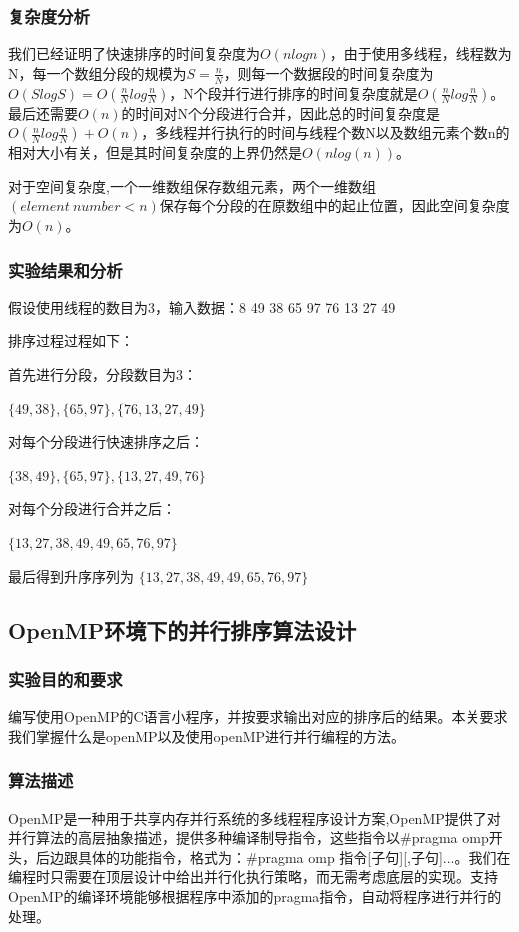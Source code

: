 \documentclass[supercite]{Experimental_Report}
\theoremstyle{definition}
\begin{document}
\subsubsection{复杂度分析}
我们已经证明了快速排序的时间复杂度为$O(nlogn)$，由于使用多线程，线程数为N，每一个数组分段的规模为$S=\frac{n}{N}$，则每一个数据段的时间复杂度为$O(SlogS)=O(\frac{n}{N}log\frac{n}{N})$，N个段并行进行排序的时间复杂度就是$O(\frac{n}{N}log\frac{n}{N})$。最后还需要$O(n)$的时间对N个分段进行合并，因此总的时间复杂度是$O(\frac{n}{N}log\frac{n}{N}) + O(n)$，多线程并行执行的时间与线程个数N以及数组元素个数n的相对大小有关，但是其时间复杂度的上界仍然是$O(nlog(n))$。

对于空间复杂度,一个一维数组保存数组元素，两个一维数组$(element\ number < n)$保存每个分段的在原数组中的起止位置，因此空间复杂度为$O(n)$。

\subsubsection{实验结果和分析}
假设使用线程的数目为3，输入数据：8  49  38  65  97  76  13  27  49

排序过程过程如下：


首先进行分段，分段数目为3：

$\{49, 38\}, \{65,97\}, \{76,13,27,49\}$

对每个分段进行快速排序之后：

$\{38, 49\}, \{65,97\}, \{13,27,49,76\}$

对每个分段进行合并之后：

$\{13,27,38,49,49,65,76,97\}$

最后得到升序序列为
$\{13, 27, 38, 49, 49, 65, 76, 97\}$


\subsection{OpenMP环境下的并行排序算法设计}

\subsubsection{实验目的和要求}
编写使用OpenMP的C语言小程序，并按要求输出对应的排序后的结果。本关要求我们掌握什么是openMP以及使用openMP进行并行编程的方法。

\subsubsection{算法描述}
OpenMP是一种用于共享内存并行系统的多线程程序设计方案,OpenMP提供了对并行算法的高层抽象描述，提供多种编译制导指令，这些指令以\#pragma omp开头，后边跟具体的功能指令，格式为：\#pragma omp 指令[子句][,子句]...。我们在编程时只需要在顶层设计中给出并行化执行策略，而无需考虑底层的实现。支持OpenMP的编译环境能够根据程序中添加的pragma指令，自动将程序进行并行的处理。
\end{document}
